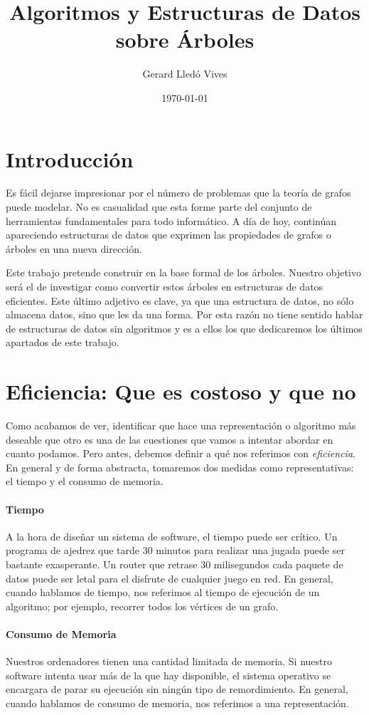 \documentclass[10pt,spanish,twocolumn]{article}
\title{Algoritmos y Estructuras de Datos sobre Árboles}
\author{Gerard Lledó Vives}
\date{\today}
\begin{document}
\maketitle

\section{Introducción}
Es fácil dejarse impresionar por el número de problemas que la teoría de grafos
puede modelar.  No es casualidad que esta forme parte del conjunto de 
herramientas fundamentales para todo informático.  A día de hoy, continúan 
apareciendo estructuras de datos que exprimen las propiedades de grafos o 
árboles en una nueva dirección.

Este trabajo pretende construir en la base formal de los árboles.  Nuestro 
objetivo será el de investigar como convertir estos árboles en estructuras de 
datos eficientes.  Este último adjetivo es clave, ya que una estructura de 
datos, no sólo almacena datos, sino que les da una forma.  Por esta razón no 
tiene sentido hablar de estructuras de datos sin algoritmos y es a ellos los 
que dedicaremos los últimos apartados de este trabajo.

\section{Eficiencia: Que es costoso y que no}
Como acabamos de ver, identificar que hace una representación o algoritmo más 
deseable que otro es una de las cuestiones que vamos a intentar abordar en 
cuanto podamos.  Pero antes, debemos definir a qué nos referimos con 
\emph{eficiencia}.  En general y de forma abstracta, tomaremos dos medidas como 
representativas: el tiempo y el consumo de memoria.

\paragraph{Tiempo} A la hora de diseñar un sistema de software, el tiempo puede 
ser crítico.  Un programa de ajedrez que tarde 30 minutos para realizar una 
jugada puede ser bastante exasperante.  Un router que retrase 30 milisegundos 
cada paquete de datos puede ser letal para el disfrute de cualquier juego en 
red.  En general, cuando hablamos de tiempo, nos referimos al tiempo de 
ejecución de un algoritmo; por ejemplo, recorrer todos los vértices de un 
grafo.

\paragraph{Consumo de Memoria} Nuestros ordenadores tienen una cantidad 
limitada de memoria.  Si nuestro software intenta usar más de la que hay 
disponible, el sistema operativo se encargara de parar su ejecución sin ningún 
tipo de remordimiento.  En general, cuando hablamos de consumo de memoria, nos 
referimos a una representación.
\end{document}
